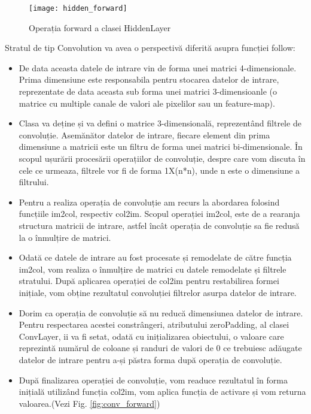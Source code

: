 	
	\begin{figure}[H]
		\texttt{[image: hidden\_forward]}  
		\caption{\label{fig:hidden_forward} Operația forward a clasei HiddenLayer}
	\end{figure}

	\newpage
	
	Stratul de tip Convolution va avea o perspectivă diferită asupra funcției follow:
	\begin{itemize}
		
	\item	 De data aceasta datele de intrare vin de forma unei matrici 4-dimensionale. Prima dimensiune este responsabila pentru stocarea datelor de intrare, reprezentate de data aceasta sub forma unei matrici 3-dimensioanle (o matrice cu multiple canale de valori ale pixelilor sau un feature-map).
	
	\item	Clasa va deține și va defini o matrice 3-dimensională, reprezentând filtrele de convoluție. Asemănător datelor de intrare, fiecare element din prima dimensiune a matricii este un filtru de forma unei matrici bi-dimensionale. În scopul ușurării procesării operațiilor de convoluție, despre care vom discuta în cele ce urmeaza, filtrele vor fi de forma 1X(n*n), unde n este o dimensiune a filtrului.
	
	
	\item	Pentru a realiza operația de convoluție am recurs la abordarea folosind funcțiile im2col, respectiv col2im. Scopul operației im2col, este de a rearanja structura matricii de intrare, astfel încât operația de convoluție sa fie redusă la o înmulțire de matrici.
	
	\item	Odată ce datele de intrare au fost procesate și remodelate de către funcția im2col, vom realiza o înmulțire de matrici cu datele remodelate și filtrele stratului. După aplicarea operației de col2im pentru restabilirea formei inițiale, vom obține rezultatul convoluției filtrelor asurpa datelor de intrare.
	
	
	\item	Dorim ca operația de convoluție să nu reducă dimensiunea datelor de intrare. Pentru respectarea acestei constrângeri, atributului zeroPadding, al clasei ConvLayer, ii va fi setat, odată cu inițializarea obiectului, o valoare care reprezintă numărul de coloane și randuri de valori de 0 ce trebuiesc adăugate datelor de intrare pentru a-și păstra forma după operația de convoluție.
	
	\item	După finalizarea operației de convoluție, vom readuce rezultatul în forma inițială utilizând funcția col2im, vom aplica funcția de activare și vom returna valoarea.(Vezi Fig. \ref{fig:conv_forward})

	\end{itemize}


